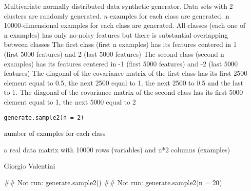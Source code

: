 \documentclass{article}
\begin{document}
\begin{Description}\relax
Multivariate normally  distributed data synthetic generator.
Data sets with 2 clusters are randomly generated.
\emph{n} examples for each class are generated.
n 10000-dimensional examples for each class are generated.
All classes (each one of n examples) has only no-noisy features but there is substantial overlapping between classes
The first class (first n examples) has its features centered in 1 (first 5000 features) and 2 (last 5000 features)
The second class (second n examples) has its features centered in -1 (first 5000 features) and -2 (last 5000 features)
The diagonal of the covariance matrix of the first class has its first 2500 element equal to 0.5, the next 2500 equal to 1,
the next 2500 to 0.5 and the last to 1.
The diagonal of the covariance matrix of the second class has its first 5000 element equal to 1, the next 5000 equal to 2
\end{Description}
\begin{Usage}
\begin{verbatim}
generate.sample2(n = 2)
\end{verbatim}
\end{Usage}
\begin{Arguments}
\begin{ldescription}
\item[\code{n}] number of examples for each class 
\end{ldescription}
\end{Arguments}
\begin{Value}
a real data matrix with 10000 rows (variables) and n*2 columns (examples)
\end{Value}
\begin{Author}\relax
Giorgio Valentini 
\end{Author}
\begin{Examples}
\begin{ExampleCode}
## Not run: generate.sample2()
## Not run: generate.sample2(n = 20)
\end{ExampleCode}
\end{Examples}
\end{document}

